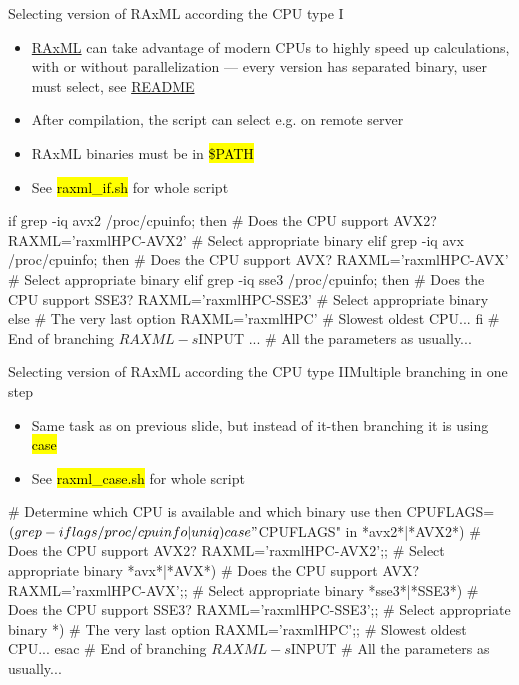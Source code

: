 \documentclass[compress, ucs, xelatex, 11pt, xcolor=svgnames,
  hyperref={
    bookmarks=true,
    unicode=true,
    colorlinks=true,
    pdftitle={Linux, command line and MetaCentrum},
    plainpages=false,
    pdfauthor={Vojtech Zeisek},
    pdfsubject={Course about use of Linux command line, writing shell scripts and using MetaCentrum of CESNET},
    pdfcreator={XeLaTeX},
    pdfkeywords={Linux, GNU, BASH, shell, command line, MetaCentrum},
    linkcolor=DarkRed,
    anchorcolor=DarkBlue,
    citecolor=Indigo,
    filecolor=NavyBlue,
    menucolor=DarkMagenta,
    urlcolor=DarkBlue,
    pdftex},
  url={hyphens, lowtilde} %
  ]{beamer}
\renewcommand{\texttt}[1]{\hl{\ttfamily #1}}
\begin{document}
\begin{frame}[fragile]{Selecting version of RAxML according the CPU type I}
  \begin{itemize}
    \item \href{https://github.com/stamatak/standard-RAxML}{RAxML} can take advantage of modern CPUs to highly speed up calculations, with or without parallelization --- every version has separated binary, user must select, see \href{https://github.com/stamatak/standard-RAxML/blob/master/README}{README}
    \item After compilation, the script can select e.g. on remote server
    \item RAxML binaries must be in \texttt{\$PATH}
    \item See \texttt{raxml\_if.sh} for whole script
  \end{itemize}
  \begin{bashcode}
    if grep -iq avx2 /proc/cpuinfo; then # Does the CPU support AVX2?
      RAXML='raxmlHPC-AVX2' # Select appropriate binary
      elif grep -iq avx /proc/cpuinfo; then # Does the CPU support AVX?
        RAXML='raxmlHPC-AVX' # Select appropriate binary
        elif grep -iq sse3 /proc/cpuinfo; then # Does the CPU support SSE3?
          RAXML='raxmlHPC-SSE3' # Select appropriate binary
          else # The very last option
            RAXML='raxmlHPC' # Slowest oldest CPU...
      fi # End of branching
    $RAXML -s $INPUT ... # All the parameters as usually...
  \end{bashcode}
\end{frame}

\begin{frame}[fragile]{Selecting version of RAxML according the CPU type II}{Multiple branching in one step}
  \begin{itemize}
    \item Same task as on previous slide, but instead of it-then branching it is using \texttt{case}
    \item See \texttt{raxml\_case.sh} for whole script
  \end{itemize}
  \begin{bashcode}
    # Determine which CPU is available and which binary use then
    CPUFLAGS=$(grep -i flags /proc/cpuinfo | uniq)
    case "$CPUFLAGS" in
      *avx2*|*AVX2*) # Does the CPU support AVX2?
        RAXML='raxmlHPC-AVX2';; # Select appropriate binary
      *avx*|*AVX*) # Does the CPU support AVX?
        RAXML='raxmlHPC-AVX';; # Select appropriate binary
      *sse3*|*SSE3*) # Does the CPU support SSE3?
        RAXML='raxmlHPC-SSE3';; # Select appropriate binary
      *) # The very last option
        RAXML='raxmlHPC';; # Slowest oldest CPU...
      esac # End of branching
    $RAXML -s $INPUT # All the parameters as usually...
  \end{bashcode}
\end{frame}
\end{document}
